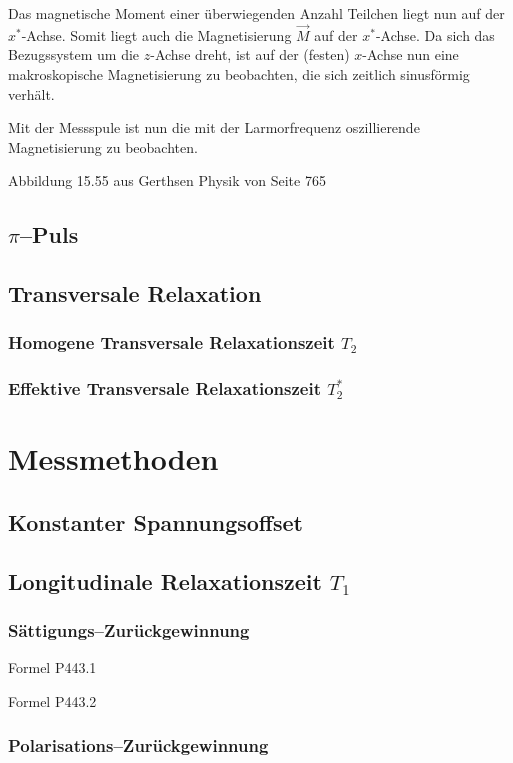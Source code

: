 Das magnetische Moment einer überwiegenden Anzahl Teilchen liegt nun auf der
$x^*$-Achse. Somit liegt auch die Magnetisierung $\vec M$ auf der $x^*$-Achse.
Da sich das Bezugssystem um die $z$-Achse dreht, ist auf der (festen) $x$-Achse
nun eine makroskopische Magnetisierung zu beobachten, die sich zeitlich
sinusförmig verhält.

Mit der Messspule ist nun die mit der Larmorfrequenz oszillierende
Magnetisierung zu beobachten.

Abbildung 15.55 aus Gerthsen Physik von Seite 765

\subsection{$\pi$–Puls}
\subsection{Transversale Relaxation}
\subsubsection{Homogene Transversale Relaxationszeit $T_2$}
\subsubsection{Effektive Transversale Relaxationszeit $T_2^*$}

\section{Messmethoden}
\subsection{Konstanter Spannungsoffset}
\subsection{Longitudinale Relaxationszeit $T_1$}
\subsubsection{Sättigungs–Zurückgewinnung}

Formel P443.1

Formel P443.2

\subsubsection{Polarisations–Zurückgewinnung}

